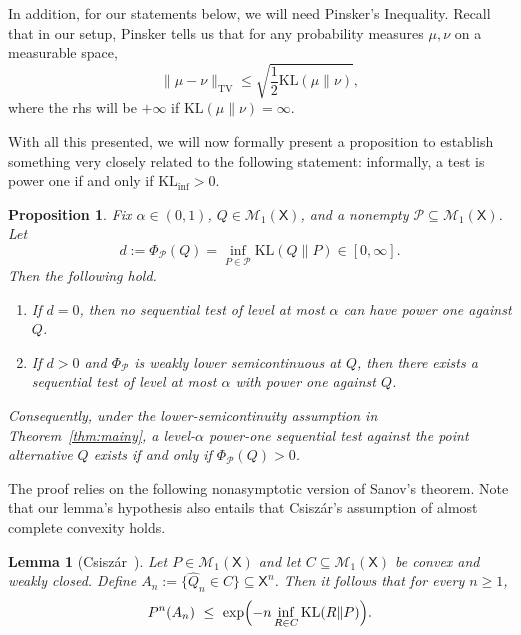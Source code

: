 \documentclass[11pt]{article}
\newcommand{\KL}{\mathrm{KL}}
\newcommand{\KLinf}{\mathrm{KL}_{\mathrm{inf}}}
\newcommand{\Pcal}{\mathcal{P}}
\newcommand{\X}{\mathsf{X}}
\newtheorem{proposition}[theorem]{Proposition}
\newtheorem{lemma}[theorem]{Lemma}
\theoremstyle{definition}
\theoremstyle{definition}
\begin{document}
\noindent In addition, for our statements below, we will need Pinsker's Inequality. Recall that in our setup, Pinsker tells us that for any probability measures $\mu, \nu$ on a measurable space,
\begin{equation}\label{eq:pink}
\|\mu-\nu\|_{\mathrm{TV}}\le \sqrt{\frac12\KL(\mu\|\nu)},
\end{equation}
where the rhs will be $+\infty$ if $\KL(\mu\|\nu)=\infty$. 


\noindent With all this presented, we will now formally present a proposition to establish something very closely related to the following statement: informally, a test is power one if and only if $\KLinf>0$.


\begin{proposition}\label{prop:seq-power-one}
Fix $\alpha\in(0,1)$, $Q\in\mathcal M_1(\X)$, and a nonempty $\Pcal\subseteq\mathcal M_1(\X)$.  Let
\[
  d:=\Phi_\Pcal(Q)=\inf_{P\in\Pcal}\KL(Q\|P)\in[0,\infty].
\]
Then the following hold.
\begin{enumerate}
    \item If $d=0$, then no sequential test of level at most $\alpha$ can have power one against $Q$.
    \item If $d>0$ and $\Phi_\Pcal$ is weakly lower semicontinuous at $Q$, then there exists a sequential test of level at most $\alpha$ with power one against $Q$.
\end{enumerate}
Consequently, under the lower-semicontinuity assumption in Theorem~\ref{thm:mainy}, a level-$\alpha$ power-one sequential test against the point alternative $Q$ exists if and only if $\Phi_\Pcal(Q)>0$.
\end{proposition}


The proof relies on the following nonasymptotic version of Sanov's theorem. Note that our lemma's hypothesis also entails that Csisz{\'a}r's assumption of almost complete convexity holds.

\begin{lemma}[Csisz{\'a}r~\cite{csiszar1984sanov}]\label{lem:convex-empirical}
Let $P\in\mathcal M_1(\X)$ and let $C\subseteq\mathcal M_1(\X)$ be convex and weakly closed. Define $A_n:=\{\widehat Q_n\in C\}\subseteq \X^n$. Then it follows that for every $n\ge 1$,
\[
P^n(A_n)\ \le\ \exp\Bigl(-n\inf_{R\in C}\KL(R\|P)\Bigr).
\]
\end{lemma}
\end{document}
